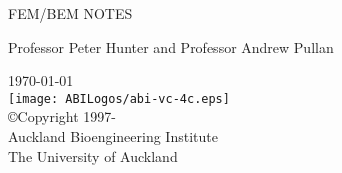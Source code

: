 \thispagestyle{empty}

\begin{center}
   \huge FEM/BEM NOTES
   \vspace{10mm}   


   \vspace{80mm}   
   \large   
      Professor Peter Hunter and Professor Andrew Pullan\\   
   \vspace{30mm}   
   
   \normalsize   
   \today\\   %

   \large
   \vspace{30mm}
   \texttt{[image: ABILogos/abi-vc-4c.eps]}\\   
   \vspace{10mm}
   \small
   \copyright \thickspace Copyright 1997-\the\year \\
   Auckland Bioengineering Institute\\
   The University of Auckland
\end{center}





